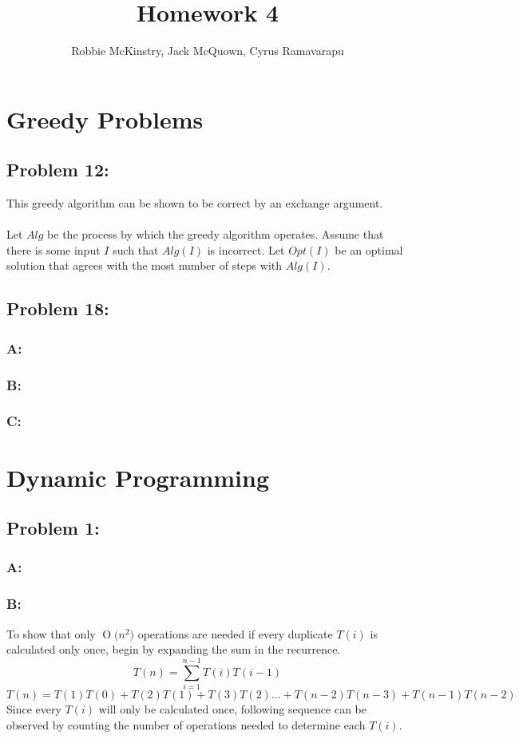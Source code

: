 \documentclass[12pt]{article}
\newcommand{\BigO}[1]{\ensuremath{\operatorname{O}\bigl(#1\bigr)}}
\begin{document}
\title{Homework 4}
\author{Robbie McKinstry, Jack McQuown, Cyrus Ramavarapu}
\renewcommand{\today}{9 September 2016}
\renewcommand{\baselinestretch}{1.5}

\maketitle

\section*{Greedy Problems}
\subsection*{Problem 12:}
This greedy algorithm can be shown to be correct by an exchange argument.\\\\
Let $Alg$ be the process by which the greedy algorithm operates.  Assume that
there is some input $I$ such that $Alg(I)$ is incorrect. Let $Opt(I)$ be an
optimal solution that agrees with the most number of steps with $Alg(I)$.

\subsection*{Problem 18:}
\subsubsection*{A:}
\subsubsection*{B:}
\subsubsection*{C:}


\section*{Dynamic Programming}
\subsection*{Problem 1:}
\subsubsection*{A:}
\subsubsection*{B:}
To show that only \BigO{n^2} operations are needed if every duplicate
$T(i)$ is calculated only once, begin by expanding the sum in the 
recurrence.
\[
T(n) = \sum_{i=1}^{n-1}T(i)T(i-1)
\]
\[ 
T(n) = T(1)T(0) + T(2)T(1) + T(3)T(2)\dots
+ T(n-2)T(n-3) + T(n-1)T(n-2)
\]
Since every $T(i)$ will only be calculated once, following sequence
can be observed by counting the number of operations needed to determine
each $T(i)$.
\end{document}
